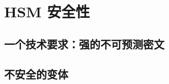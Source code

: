 \section{HSM 安全性}\label{sec:21-4}

\subsection{一个技术要求：强的不可预测密文}\label{subsec:21-4-1}

\subsection{不安全的变体}\label{subsec:21-4-2}